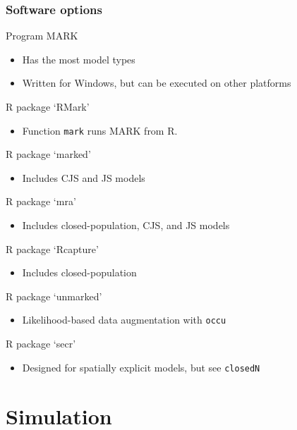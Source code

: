 \documentclass[color=usenames,dvipsnames]{beamer}\usepackage[]{graphicx}\usepackage[]{color}
\newcommand{\inr}[1]{\colorbox{inlinecolor}{\texttt{#1}}}
\begin{document}
\begin{frame}
  \frametitle{Software options}
  \small
  Program MARK
  \begin{itemize}
  \footnotesize
    \item Has the most model types
    \item Written for Windows, but can be executed on other platforms  
  \end{itemize}
  R package `RMark'
  \begin{itemize}
  \footnotesize
    \item Function \inr{mark} runs MARK from R.
  \end{itemize}
  R package `marked'
  \begin{itemize}
  \footnotesize
    \item Includes CJS and JS models
  \end{itemize}
  R package `mra'
  \begin{itemize}
  \footnotesize
    \item Includes closed-population, CJS, and JS models
  \end{itemize}
  R package `Rcapture'
  \begin{itemize}
  \footnotesize
    \item Includes closed-population
  \end{itemize}
  R package `unmarked'
  \begin{itemize}
  \footnotesize
    \item Likelihood-based data augmentation with \inr{occu}
  \end{itemize}
  R package `secr'
  \begin{itemize}
  \footnotesize
    \item Designed for spatially explicit models, but see \inr{closedN}
  \end{itemize}
\end{frame}




\section{Simulation}



\end{document}
